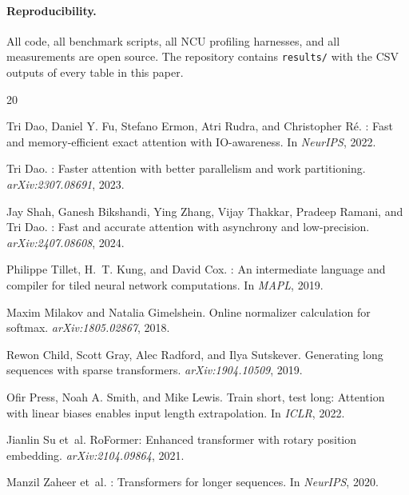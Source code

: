 \documentclass[10pt,twocolumn]{article}
\begin{document}
\paragraph{Reproducibility.} All code, all benchmark scripts, all
NCU profiling harnesses, and all measurements are open source. The
repository contains \texttt{results/} with the CSV outputs of every
table in this paper.


\begin{thebibliography}{20}

Tri Dao, Daniel Y. Fu, Stefano Ermon, Atri Rudra, and Christopher Ré.
: Fast and memory-efficient exact attention with IO-awareness.
\newblock In \emph{NeurIPS}, 2022.

Tri Dao.
: Faster attention with better parallelism and work partitioning.
\newblock \emph{arXiv:2307.08691}, 2023.

Jay Shah, Ganesh Bikshandi, Ying Zhang, Vijay Thakkar,
Pradeep Ramani, and Tri Dao.
: Fast and accurate attention with asynchrony and low-precision.
\newblock \emph{arXiv:2407.08608}, 2024.

Philippe Tillet, H.~T. Kung, and David Cox.
: An intermediate language and compiler for tiled neural network computations.
\newblock In \emph{MAPL}, 2019.

Maxim Milakov and Natalia Gimelshein.
\newblock Online normalizer calculation for softmax.
\newblock \emph{arXiv:1805.02867}, 2018.

Rewon Child, Scott Gray, Alec Radford, and Ilya Sutskever.
\newblock Generating long sequences with sparse transformers.
\newblock \emph{arXiv:1904.10509}, 2019.

Ofir Press, Noah A. Smith, and Mike Lewis.
\newblock Train short, test long: Attention with linear biases enables input length extrapolation.
\newblock In \emph{ICLR}, 2022.

Jianlin Su et~al.
\newblock RoFormer: Enhanced transformer with rotary position embedding.
\newblock \emph{arXiv:2104.09864}, 2021.

Manzil Zaheer et~al.
: Transformers for longer sequences.
\newblock In \emph{NeurIPS}, 2020.


\end{thebibliography}
\end{document}
